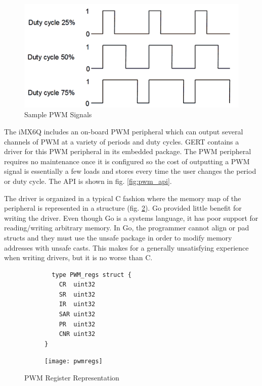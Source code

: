 \begin{figure}[h]
\begin{center}
  \includegraphics[scale=0.5]{pwm}
\end{center}
  \caption{Sample PWM Signals} \label{fig:pwm}
\end{figure}


The iMX6Q includes an on-board PWM peripheral which can output several channels of PWM
at a variety of periods and duty cycles. GERT contains a driver for this PWM peripheral in its embedded
package. The PWM peripheral requires no maintenance once it is configured so the cost of outputting
a PWM signal is essentially a few loads and stores every time the user changes the period or duty cycle.
The API is shown in fig. \ref{fig:pwm_api}.

The driver is organized in a typical C fashion where the memory map of the peripheral is represented in a structure (fig. \ref{fig:pwm_struct}).
Go provided little benefit for writing the driver. Even though Go is a systems language, it has poor
support for reading/writing arbitrary memory. In Go, the programmer cannot align or pad structs
and they must use the unsafe package in order to modify memory addresses with unsafe casts. This makes for a generally
unsatisfying experience when writing drivers, but it is no worse than C.


\begin{figure}[h]
  \begin{subfigure}[t!]{0.5\textwidth}
  \begin{lstlisting}
  type PWM_regs struct {
	CR  uint32
	SR  uint32
	IR  uint32
	SAR uint32
	PR  uint32
	CNR uint32
}
  \end{lstlisting}
  \end{subfigure}
  \begin{subfigure}[t!]{0.5\textwidth}
 \texttt{[image: pwmregs]}
  \end{subfigure}
  \caption{PWM Register Representation} \label{fig:pwm_struct}
\end{figure}

